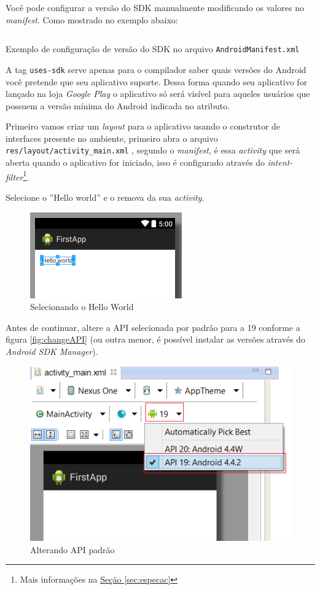 \documentclass[a4paper,12pt,brazil,oneside]{book}
\begin{document}
\begin{singlespace}
Você pode configurar a versão do SDK manualmente modificando os valores no \emph{manifest}. Como mostrado no exemplo abaixo:


\begin{listing}[H]
\inputminted[linenos=true,fontsize=\small,frame=lines, framesep=2mm, tabsize=2,numbersep=5pt]{xml}{src/firstapp/sdk-manifest.xml}
\label{AndroidManifest.sdk}
\caption{Exemplo de configuração de versão do SDK no arquivo \texttt{AndroidManifest.xml} }
\end{listing}

A tag \texttt{uses-sdk} serve apenas para o compilador saber quais versões do Android você pretende que seu aplicativo suporte. Dessa forma quando seu aplicativo for lançado na loja \emph{Google Play} o aplicativo só será visível para aqueles usuários que possuem a versão mínima do Android indicada no atributo.

Primeiro vamos criar um \emph{layout} para o aplicativo usando o construtor de interfaces presente no ambiente, primeiro abra o arquivo \texttt{res/layout/activity\_main.xml} , segundo o \emph{manifest}, é essa \emph{activity} que será aberta quando o aplicativo for iniciado, isso é configurado através do \emph{intent-filter}\footnote{Mais informações na \hyperref[sec:especac]{Seção \ref*{sec:especac}}}. 

Selecione o ''Hello world'' e o remova da sua \emph{activity}.

\begin{figure}[H]
  \centering
  \includegraphics[width=.4\textwidth]{figuras/firstapp/firstapp6.png}
  \caption{Selecionando o Hello World}
  \label{fig:firstapp6}
\end{figure}

Antes de continuar, altere a API selecionada por padrão para a 19 conforme a figura \autoref{fig:changeAPI} (ou outra menor, é possível instalar as versões através do \emph{Android SDK Manager}).

\begin{figure}[H]
  \centering
  \includegraphics[width=.5\textwidth]{figuras/firstapp/changeAPI.png}
  \caption{Alterando API padrão}
  \label{fig:changeAPI}
\end{figure}



\end{singlespace}
\end{document}
